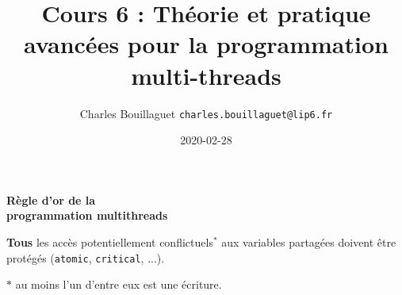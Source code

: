 \documentclass[xcolor={x11names,svgnames}]{beamer}
\author[C.~Bouillaguet]{Charles Bouillaguet \newline
  {\small \texttt{charles.bouillaguet@lip6.fr}}}
\title{Cours 6 : Théorie et pratique \og avancées\fg{} pour la programmation multi-threads}
\date{2020-02-28}
\begin{document}
\frame{\titlepage}


\begin{frame}[label=golden_rule]

  \begin{center}
    \Huge \bf \alert{Règle d'or de la \\ programmation multithreads}
  \end{center}

  \bigskip
  
  {\Large \textbf{Tous} les accès potentiellement conflictuels${}^*$ aux variables partagées doivent être protégés (\texttt{atomic}, \texttt{critical}, ...).}

  \bigskip

  $*$ au moins l'un d'entre eux est une écriture.  
\end{frame}

\end{document}
